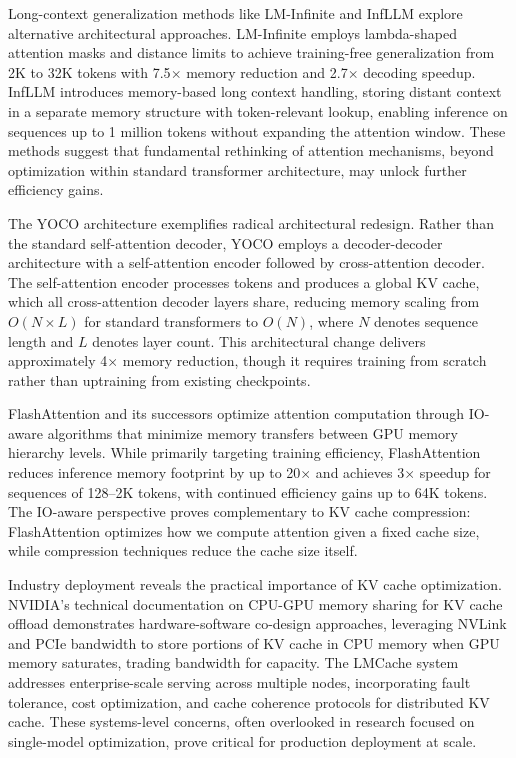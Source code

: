 \documentclass[11pt,letterpaper]{article}
\begin{document}
Long-context generalization methods like LM-Infinite \cite{han2024lminfinite} and InfLLM \cite{zhang2024infllm} explore alternative architectural approaches. LM-Infinite employs lambda-shaped attention masks and distance limits to achieve training-free generalization from 2K to 32K tokens with 7.5$\times$ memory reduction and 2.7$\times$ decoding speedup. InfLLM introduces memory-based long context handling, storing distant context in a separate memory structure with token-relevant lookup, enabling inference on sequences up to 1 million tokens without expanding the attention window. These methods suggest that fundamental rethinking of attention mechanisms, beyond optimization within standard transformer architecture, may unlock further efficiency gains.

The YOCO architecture \cite{sun2024yoco} exemplifies radical architectural redesign. Rather than the standard self-attention decoder, YOCO employs a decoder-decoder architecture with a self-attention encoder followed by cross-attention decoder. The self-attention encoder processes tokens and produces a global KV cache, which all cross-attention decoder layers share, reducing memory scaling from $O(N \times L)$ for standard transformers to $O(N)$, where $N$ denotes sequence length and $L$ denotes layer count. This architectural change delivers approximately 4$\times$ memory reduction, though it requires training from scratch rather than uptraining from existing checkpoints.

FlashAttention \cite{dao2022flashattention} and its successors optimize attention computation through IO-aware algorithms that minimize memory transfers between GPU memory hierarchy levels. While primarily targeting training efficiency, FlashAttention reduces inference memory footprint by up to 20$\times$ and achieves 3$\times$ speedup for sequences of 128--2K tokens, with continued efficiency gains up to 64K tokens. The IO-aware perspective proves complementary to KV cache compression: FlashAttention optimizes how we compute attention given a fixed cache size, while compression techniques reduce the cache size itself.

Industry deployment reveals the practical importance of KV cache optimization. NVIDIA's technical documentation on CPU-GPU memory sharing for KV cache offload demonstrates hardware-software co-design approaches, leveraging NVLink and PCIe bandwidth to store portions of KV cache in CPU memory when GPU memory saturates, trading bandwidth for capacity. The LMCache system \cite{liu2024lmcache} addresses enterprise-scale serving across multiple nodes, incorporating fault tolerance, cost optimization, and cache coherence protocols for distributed KV cache. These systems-level concerns, often overlooked in research focused on single-model optimization, prove critical for production deployment at scale.
\end{document}
